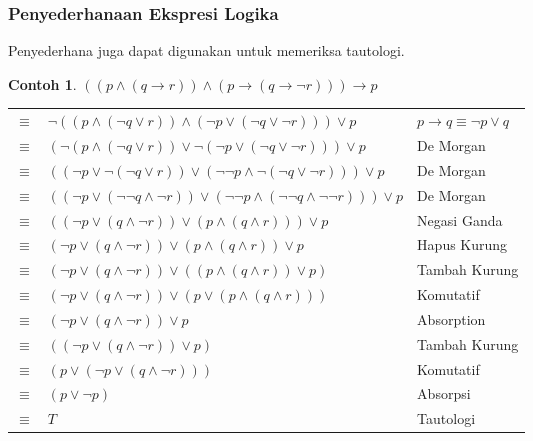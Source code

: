 \documentclass[handout]{beamer}
\theoremstyle{definition}
\theoremstyle{example}
\newtheorem{contoh}[theorem]{Contoh}
\begin{document}
\begin{frame}[shrink]
	\frametitle{Penyederhanaan Ekspresi Logika}
	Penyederhana juga dapat digunakan untuk memeriksa tautologi.\\
	\begin{contoh}
		 $((p \wedge(q \rightarrow r))\wedge(p \rightarrow(q \rightarrow \neg r)))\rightarrow p$ \\				
		\begin{tabular}{ l l  l  }						
			$\equiv$ & $\neg((p \wedge (\neg q \vee r))\wedge(\neg p \vee(\neg q \vee \neg r)))\vee p$ & $p \rightarrow q \equiv \neg p \vee q$   \\ 
			$\equiv$ & $(\neg(p \wedge (\neg q \vee r))\vee \neg(\neg p \vee(\neg q \vee \neg r)))\vee p$ & De Morgan   \\  
			$\equiv$ & $((\neg p \vee \neg(\neg q \vee r))\vee (\neg\neg p \wedge \neg(\neg q \vee \neg r)))\vee p$ & De Morgan   \\  
			$\equiv$ & $((\neg p \vee (\neg\neg q \wedge \neg r))\vee (\neg\neg p \wedge (\neg\neg q \wedge \neg\neg r)))\vee p$ & De Morgan   \\
			$\equiv$ & $((\neg p \vee (q \wedge \neg r))\vee  (p \wedge  (q \wedge r)))\vee p$ & Negasi Ganda   \\  	
			$\equiv$ & $(\neg p \vee (q \wedge \neg r))\vee  (p \wedge  (q \wedge r))\vee p$ & Hapus Kurung   \\  
			$\equiv$ & $(\neg p \vee (q \wedge \neg r))\vee ((p \wedge  (q \wedge r))\vee p)$ & Tambah Kurung   \\ 
			$\equiv$ & $(\neg p \vee (q \wedge \neg r))\vee (p \vee (p \wedge  (q \wedge r)))$ & Komutatif   \\ 
			$\equiv$ & $(\neg p \vee (q \wedge \neg r))\vee p $ & Absorption   \\ 
			$\equiv$ & $((\neg p \vee (q \wedge \neg r))\vee p) $ & Tambah Kurung   \\ 	
			$\equiv$ & $(p \vee(\neg p \vee (q \wedge \neg r))) $ & Komutatif   \\ 
			$\equiv$ & $(p \vee \neg p) $ & Absorpsi   \\
			$\equiv$ & $T$ & Tautologi   \\			
		\end{tabular}
	\end{contoh}	
\end{frame}
\end{document}
